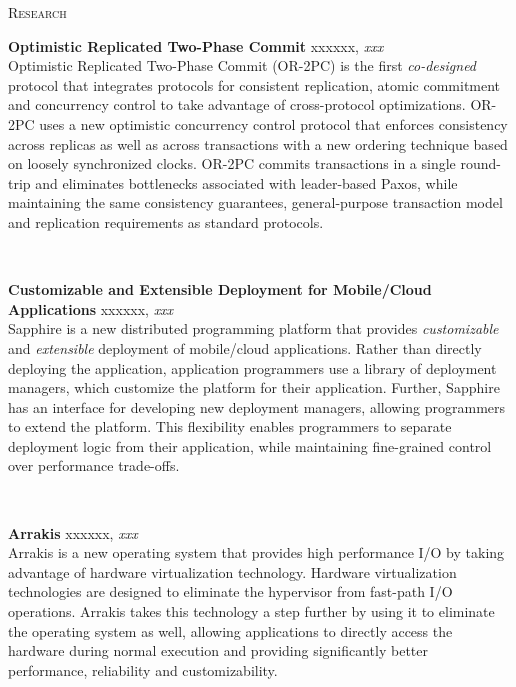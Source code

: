 \documentclass[10pt,times]{report}
\newlength{\sectiongap}
\newlength{\entrygap}
\newlength{\sectioncolwidth}
\newlength{\colgap}
\newlength{\stuffwidth}
\def\ifEqString#1#2{\def\testa{#1}\def\testb{#2}%
  \ifx\testa\testb}
\newenvironment{rtable}{
  \begin{minipage}{\textwidth}
  }{
  \end{minipage}
}
\newenvironment{rentry}[3][xxx]{
  \begin{minipage}[t]{\hsize}
    \textbf{#2}\ifEqString{#1}{xxx}\relax\else, \textit{#1}\fi
    \hspace{\stretch{1}} #3 \\
  }{
    \removelastskip
  \end{minipage}
  \\[\entrygap]  %
}
\newenvironment{rsection}[1]{
  \begin{minipage}[t]{\sectioncolwidth}
    \textsc{#1}
  \end{minipage}
  \hspace{\colgap}
  \begin{minipage}[t]{\stuffwidth}
  }{
    \removelastskip
  \end{minipage}
  \\[\sectiongap]
}
\begin{document}
\begin{rtable}
  \begin{rsection}{Research}
    \begin{rentry}{Optimistic Replicated Two-Phase Commit}{}
      Optimistic Replicated Two-Phase Commit (OR-2PC) is the first
      \emph{co-designed} protocol that integrates protocols for
      consistent replication, atomic commitment and concurrency
      control to take advantage of cross-protocol
      optimizations. OR-2PC uses a new optimistic concurrency control
      protocol that enforces consistency across replicas as well as
      across transactions with a new ordering technique based on
      loosely synchronized clocks. OR-2PC commits transactions in a
      single round-trip and eliminates bottlenecks associated with
      leader-based Paxos, while maintaining the same consistency
      guarantees, general-purpose transaction model and replication
      requirements as standard protocols.
    \end{rentry}

    \begin{rentry}{Customizable and Extensible Deployment for
        Mobile/Cloud Applications}{}
      Sapphire is a new distributed programming platform that provides
      \emph{customizable} and \emph{extensible} deployment of
      mobile/cloud applications. Rather than directly deploying the
      application, application programmers use a library of deployment
      managers, which customize the platform for their
      application. Further, Sapphire has an interface for developing
      new deployment managers, allowing programmers to extend the
      platform. This flexibility enables programmers to separate
      deployment logic from their application, while maintaining
      fine-grained control over performance trade-offs.
    \end{rentry}

    \begin{rentry}{Arrakis}{}
      Arrakis is a new operating system that provides high performance
      I/O by taking advantage of hardware virtualization
      technology. Hardware virtualization technologies are designed to
      eliminate the hypervisor from fast-path I/O operations. Arrakis
      takes this technology a step further by using it to eliminate
      the operating system as well, allowing applications to directly
      access the hardware during normal execution and providing
      significantly better performance, reliability and
      customizability.
    \end{rentry}


\end{rsection}
\end{rtable}
\end{document}
